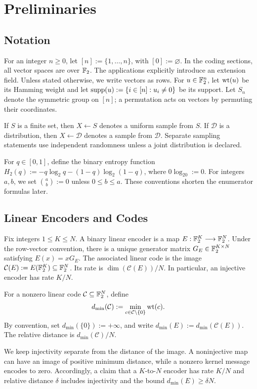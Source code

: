 \section{Preliminaries}
\label{sec:preliminaries}

\subsection{Notation}

For an integer $n\ge0$, let $[n]:=\{1,\ldots,n\}$, with $[0]:=\varnothing$.
In the coding sections, all vector spaces are over $\mathbb F_2$.
The applications explicitly introduce an extension field.
Unless stated otherwise, we write vectors as rows. For
$u\in\mathbb F_2^n$, let $\operatorname{wt}(u)$ be its Hamming weight and let
$\operatorname{supp}(u):=\{i\in[n]:u_i\ne0\}$ be its support. Let $S_n$ denote the symmetric
group on $[n]$; a permutation acts on vectors by permuting their coordinates.

If $S$ is a finite set, then $X\gets S$ denotes a uniform sample from $S$. If
$\mathcal D$ is a distribution, then $X\gets\mathcal D$ denotes a sample from
$\mathcal D$. Separate sampling statements use independent randomness unless
a joint distribution is declared.

For $q\in[0,1]$, define the binary entropy function
$H_2(q):=-q\log_2q-(1-q)\log_2(1-q)$, where $0\log_20:=0$. For integers $a,b$, we set $\binom{a}{b}:=0$ unless
$0\le b\le a$. These conventions shorten the enumerator formulas later.

\subsection{Linear Encoders and Codes}

Fix integers $1\le K\le N$. A binary linear encoder is a map
$E:\mathbb F_2^K\longrightarrow\mathbb F_2^N$. Under the row-vector convention, there is a unique generator matrix
$G_E\in\mathbb F_2^{K\times N}$ satisfying $E(x)=xG_E$. The associated linear code is
the image $\mathcal C(E):=E(\mathbb F_2^K)\subseteq\mathbb F_2^N$.
Its rate is $\dim(\mathcal C(E))/N$. In particular, an injective encoder has
rate $K/N$.

For a nonzero linear code $\mathcal C\subseteq\mathbb F_2^N$, define
\[
  d_{\min}(\mathcal C)
  :=\min_{c\in\mathcal C\setminus\{0\}}\operatorname{wt}(c).
\]
By convention, set $d_{\min}(\{0\}):=+\infty$, and write
$d_{\min}(E):=d_{\min}(\mathcal C(E))$. The relative distance is
$d_{\min}(\mathcal C)/N$.

We keep injectivity separate from the distance of the image. A noninjective
map can have an image of positive minimum distance, while a nonzero kernel
message encodes to zero. Accordingly, a claim that a $K$-to-$N$ encoder has
rate $K/N$ and relative distance $\delta$ includes injectivity and the bound
$d_{\min}(E)\ge\delta N$.

